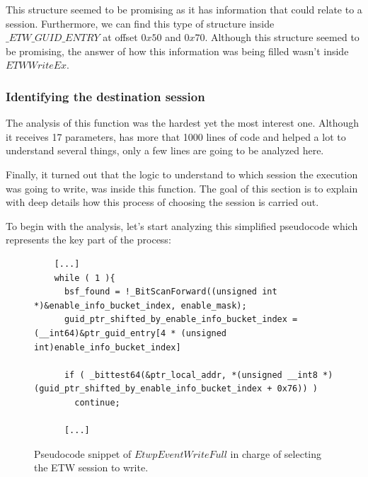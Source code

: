 This structure seemed to be promising as it has information that could relate to a session. Furthermore, we can find this type of structure inside $\_ETW\_GUID\_ENTRY$ at offset $0x50$ and $0x70$. Although this structure seemed to be promising, the answer of how this information was being filled wasn't  inside $ETWWriteEx$. 

\subsubsection{\bfseries Identifying the destination session}
The analysis of this function was the hardest yet the most interest one. Although it receives 17 parameters, has more that 1000 lines of code and helped a lot to understand several things, only a few lines are going to be analyzed here. 

Finally, it turned out that the logic to understand to which session the execution was going to write, was inside this function. The goal of this section is to explain with deep details how this process of choosing the session is carried out. 

To begin with the analysis, let's start analyzing this simplified pseudocode which represents the key part of the process:

\begin{figure}[H]
  \begin{lstlisting}
    [...]
    while ( 1 ){                  
      bsf_found = !_BitScanForward((unsigned int *)&enable_info_bucket_index, enable_mask);
      guid_ptr_shifted_by_enable_info_bucket_index = (__int64)&ptr_guid_entry[4 * (unsigned int)enable_info_bucket_index]
      
      if ( _bittest64(&ptr_local_addr, *(unsigned __int8 *)(guid_ptr_shifted_by_enable_info_bucket_index + 0x76)) )
        continue;

      [...]
  \end{lstlisting} 
  \caption[]{Pseudocode snippet of $EtwpEventWriteFull$ in charge of selecting the ETW session to write.}
  \label{fig:session_to_write_selection}
\end{figure}


